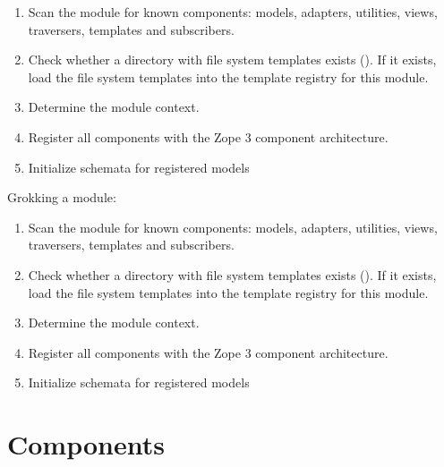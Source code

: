 \documentclass[10pt,a4paper,english]{manual}
\begin{document}
\begin{enumerate}

    \item Scan the module for known components: models, adapters,
          utilities, views, traversers, templates and subscribers.

    \item Check whether a directory with file system templates
          exists ().  If it exists,
          load the file system templates into the template
          registry for this module.

    \item Determine the module context.

    \item Register all components with the Zope 3 component architecture.

    \item Initialize schemata for registered models

\end{enumerate}

Grokking a module:

\begin{enumerate}

    \item {
Scan the module for known components: models, adapters,
utilities, views, traversers, templates and subscribers.
}

    \item Check whether a directory with file system templates
          exists ().  If it exists,
          load the file system templates into the template
          registry for this module.

    \item Determine the module context.

    \item Register all components with the Zope 3 component architecture.

    \item Initialize schemata for registered models

\end{enumerate}

\begin{note}
\end{note}%



\chapter{Components}
\end{document}
